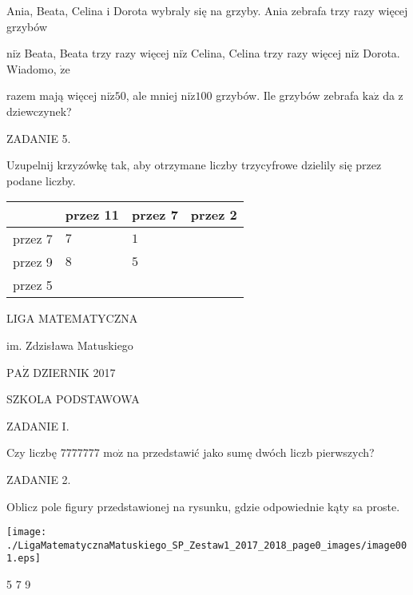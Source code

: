 \documentclass[a4paper,12pt]{article}
\begin{document}
Ania, Beata, Celina i Dorota wybraly się na grzyby. Ania zebrafa trzy razy więcej grzybów

$\mathrm{n}\mathrm{i}\dot{\mathrm{z}}$ Beata, Beata trzy razy więcej $\mathrm{n}\mathrm{i}\dot{\mathrm{z}}$ Celina, Celina trzy razy więcej $\mathrm{n}\mathrm{i}\dot{\mathrm{z}}$ Dorota. Wiadomo, $\dot{\mathrm{z}}\mathrm{e}$

razem mają więcej $\mathrm{n}\mathrm{i}\dot{\mathrm{z}}50$, ale mniej $\mathrm{n}\mathrm{i}\dot{\mathrm{z}}100$ grzybów. Ile grzybów zebrafa $\mathrm{k}\mathrm{a}\dot{\mathrm{z}}$ da z dziewczynek?

ZADANIE 5.

Uzupelnij krzyzówkę tak, aby otrzymane liczby trzycyfrowe dzielily się przez podane liczby.
\begin{center}
\begin{tabular}{|l|l|l|l|}
\hline
\multicolumn{1}{|l|}{}&	\multicolumn{1}{|l|}{przez 11}&	\multicolumn{1}{|l|}{przez 7}&	\multicolumn{1}{|l|}{przez 2}	\\
\hline
\multicolumn{1}{|l|}{przez 7}&	\multicolumn{1}{|l|}{$7$}&	\multicolumn{1}{|l|}{ $1$}&	\multicolumn{1}{|l|}{}	\\
\hline
\multicolumn{1}{|l|}{przez 9}&	\multicolumn{1}{|l|}{$8$}&	\multicolumn{1}{|l|}{ $5$}&	\multicolumn{1}{|l|}{}	\\
\hline
\multicolumn{1}{|l|}{przez 5}&	\multicolumn{1}{|l|}{}&	\multicolumn{1}{|l|}{}&	\multicolumn{1}{|l|}{}	\\
\hline
\end{tabular}

\end{center}





LIGA MATEMATYCZNA

im. Zdzisława Matuskiego

$\mathrm{P}\mathrm{A}\dot{\mathrm{Z}}$ DZIERNIK 2017

SZKOLA PODSTAWOWA

ZADANIE I.

Czy liczbę 7777777 $\mathrm{m}\mathrm{o}\dot{\mathrm{z}}$ na przedstawić jako sumę dwóch liczb pierwszych?

ZADANIE 2.

Oblicz pole figury przedstawionej na rysunku, gdzie odpowiednie kąty sa proste.
\begin{center}
\texttt{[image: ./LigaMatematycznaMatuskiego\_SP\_Zestaw1\_2017\_2018\_page0\_images/image001.eps]}
\end{center}
5  7  9
\end{document}
